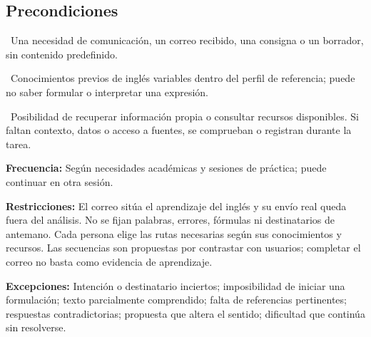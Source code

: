 \documentclass[10pt,a4paper]{article}
\begin{document}
\subsection*{Precondiciones}
{\setlength{\parskip}{2pt}\textbullet\ Una necesidad de comunicación, un correo recibido, una consigna o un borrador, sin contenido predefinido.\par}
{\setlength{\parskip}{2pt}\textbullet\ Conocimientos previos de inglés variables dentro del perfil de referencia; puede no saber formular o interpretar una expresión.\par}
{\setlength{\parskip}{2pt}\textbullet\ Posibilidad de recuperar información propia o consultar recursos disponibles. Si faltan contexto, datos o acceso a fuentes, se comprueban o registran durante la tarea.\par}
\textbf{Frecuencia:} Según necesidades académicas y sesiones de práctica; puede continuar en otra sesión.\par
\textbf{Restricciones:} El correo sitúa el aprendizaje del inglés y su envío real queda fuera del análisis. No se fijan palabras, errores, fórmulas ni destinatarios de antemano. Cada persona elige las rutas necesarias según sus conocimientos y recursos. Las secuencias son propuestas por contrastar con usuarios; completar el correo no basta como evidencia de aprendizaje.\par
\textbf{Excepciones:} Intención o destinatario inciertos; imposibilidad de iniciar una formulación; texto parcialmente comprendido; falta de referencias pertinentes; respuestas contradictorias; propuesta que altera el sentido; dificultad que continúa sin resolverse.\par
\end{document}
